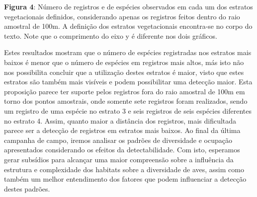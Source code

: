 \textbf{Figura 4}: Número de registros e de espécies observados em cada um dos estratos vegetacionais definidos, considerando apenas os registros feitos dentro do raio amostral de 100m. A definição dos estratos vegetacionais encontra-se no corpo do texto. Note que o comprimento do eixo y é diferente nos dois gráficos.

Estes resultados mostram que o número de espécies registradas nos estratos mais baixos é menor que o número de espécies em registros mais altos, más isto não nos possibilita concluir que a utilização destes estratos é maior, visto que estes estratos são também mais visíveis e podem possibilitar uma detecção maior. Esta proposição parece ter suporte pelos registros fora do raio amostral de 100m em torno dos pontos amostrais, onde somente sete registros foram realizados, sendo um registro de uma espécie no estrato 3 e seis registros de seis espécies diferentes no estrato 4. Assim, quanto maior a distância dos registros, mais dificultada parece ser a detecção de registros em estratos mais baixos. Ao final da última campanha de campo, iremos analisar os padrões de diversidade e ocupação apresentados considerando os efeitos da detectabilidade. Com isto, esperamos gerar subsídios para alcançar uma maior compreensão sobre a influência da estrutura e complexidade dos habitats sobre a diversidade de aves, assim como também um melhor entendimento dos fatores que podem influenciar a detecção destes padrões.